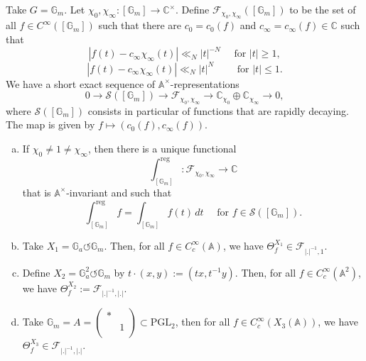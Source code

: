 \documentclass[reqno]{amsart} 
\numberwithin{theorem}{section}
\numberwithin{equation}{section}
\numberwithin{exercise}{section}
\begin{document}
\begin{example}\label{example:cq6thubuij}
  Take $G = \mathbb{G}_m$.  Let $\chi_0, \chi_\infty :[\mathbb{G}_m] \rightarrow \mathbb{C}^\times$.  Define $\mathcal{F}_{\chi_0, \chi_\infty}([\mathbb{G}_m])$ to be the set of all $f \in C^\infty([\mathbb{G}_m])$ such that there are $c_0 = c_0(f)$ and $c_\infty = c_\infty(f) \in \mathbb{C}$ such that
  \begin{equation*}
    \left\lvert f(t) - c_\infty \chi_\infty(t) \right\rvert \ll_N \lvert t \rvert^{- N}
    \quad \text{ for } \lvert t \rvert \geq 1,
  \end{equation*}
  \begin{equation*}
    \left\lvert f(t) - c_\infty \chi_\infty(t) \right\rvert \ll_N \lvert t \rvert^{N} \qquad \text{ for } \lvert t \rvert \leq 1.
  \end{equation*}
  We have a short exact sequence of $\mathbb{A}^\times$-representations
  \begin{equation*}
    0 \rightarrow \mathcal{S}([\mathbb{G}_m]) \rightarrow \mathcal{F}_{\chi_0, \chi_\infty} \rightarrow \mathbb{C}_{\chi_0} \oplus \mathbb{C}_{\chi_\infty} \rightarrow 0,
  \end{equation*}
  where $\mathcal{S}([\mathbb{G}_m])$ consists in particular of functions that are rapidly decaying.  The map is given by $f \mapsto(c_0(f), c_\infty(f))$.
  \begin{enumerate}[(a)]
  \item\label{enumerate:cq6tht3m44} If $\chi_0 \neq 1 \neq \chi_\infty$, then there is a unique functional
    \begin{equation*}
      \int_{[\mathbb{G}_m]}^{\mathrm{reg}} : \mathcal{F}_{\chi_0, \chi_\infty} \rightarrow \mathbb{C}
    \end{equation*}
    that is $\mathbb{A}^\times$-invariant and such that
    \begin{equation*}
      \int_{[\mathbb{G}_m]}^{\mathrm{reg}} f = \int_{[\mathbb{G}_m]} f(t) \, d t
      \quad \text{ for } f \in \mathcal{S}([\mathbb{G}_m]).
    \end{equation*}
  \item\label{enumerate:cq6tht3n8y} Take $X_1 = \mathbb{G}_a \circlearrowleft \mathbb{G}_m$.  Then, for all $f \in C_c^\infty(\mathbb{A})$, we have $\Theta_f^{X_1} \in \mathcal{F}_{\lvert . \rvert^{-1}, 1}$.
  \item\label{enumerate:cq6tht4jar} Define $X_2 = \mathbb{G}_a^2 \circlearrowleft \mathbb{G}_m$ by $t \cdot(x, y) :=(t x, t^{-1} y)$.  Then, for all $f \in C_c^\infty(\mathbb{A}^2)$, we have $\Theta_f^{X_2} := \mathcal{F}_{\lvert . \rvert^{-1}, \lvert . \rvert}$.
  \item\label{enumerate:cq6tht7mp9} Take $\mathbb{G}_m = A = \left(
      \begin{smallmatrix}
        \ast&\\
         &1 \\
      \end{smallmatrix}
    \right) \subset \mathrm{PGL}_2$, then for all $f \in C_c^\infty(X_3(\mathbb{A}))$, we have $\Theta_f^{X_3} \in \mathcal{F}_{\lvert . \rvert^{-1}, \lvert . \rvert}$.
  \end{enumerate}
\end{example}




{} 
\end{document}
